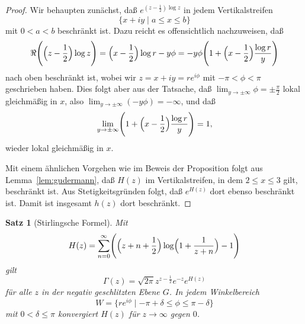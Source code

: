 \documentclass[a4paper,twoside,openright]{report}
\newtheorem{thm}{Satz}[chapter]
\theoremstyle{definition}
\theoremstyle{remark}
\begin{document}
\begin{proof}
  Wir behaupten zunächst, daß $e^{(z - \frac 1 2) \log z}$ in jedem
  Vertikalstreifen
  \[
    \{x + i y \mid a \leq x \leq b\}
  \]
  mit $0 < a < b$
  beschränkt ist. Dazu reicht es offensichtlich nachzuweisen, daß
  \[
    \Re\Biggl(\Bigl(z - \frac 1 2\Bigr) \log z\Biggr) 
    = \Bigl(x - \frac 1 2\Bigr) \log r - y \phi
    = - y \phi \Biggl(1 + \Bigl(x - \frac 1 2\Bigr) \frac{\log r} y\Biggr)
  \]
  nach oben beschränkt ist, wobei wir $z = x + i y = r e^{i \phi}$ mit
  $-\pi < \phi < \pi$ geschrieben haben. Dies folgt aber aus der Tatsache, 
  daß $\lim_{y \to \pm \infty} \phi = \pm \frac{\pi} 2$ lokal gleichmäßig in $x$, also
  $\lim_{y \to \pm \infty} (-y \phi) = -\infty$, und daß
  \[
    \lim_{y \to \pm \infty} \Biggl(1 + \Bigl(x - \frac 1 2\Bigr) \frac{\log r} y\Biggr) = 1,
  \]
  wieder lokal gleichmäßig in $x$.
  
  Mit einem ähnlichen Vorgehen wie im Beweis der Proposition folgt aus
  Lemma~\ref{lem:gudermann}, daß $H(z)$ im Vertikalstreifen, in dem $2 \leq x
  \leq 3$ gilt, beschränkt ist. Aus Stetigkeitsgründen folgt, daß
  $e^{H(z)}$ dort ebenso beschränkt ist. Damit ist insgesamt $h(z)$
  dort beschränkt.
\end{proof}

\begin{thm}[Stirlingsche Formel]
  Mit
  \[
    H(z) = \sum_{n = 0}^\infty \Biggl(\Bigl(z + n + \frac 1 2\Bigr) \log
      \Bigl(1 + \frac 1 {z + n}\Bigr) - 1\Biggr)
  \]
  gilt
  \[
    \Gamma(z) = \sqrt{2 \pi} z^{z - \frac 1 2} e^{-z} e^{H(z)}
  \]
  für alle $z$ in der negativ geschlitzten Ebene $G$. In jedem Winkelbereich
  \[
    W = \{r e^{i \phi} \mid -\pi + \delta \leq \phi \leq \pi - \delta\}
  \]
  mit $0 < \delta \leq \pi$ konvergiert $H(z)$ für $z \to \infty$ gegen $0$.
\end{thm}
\end{document}
